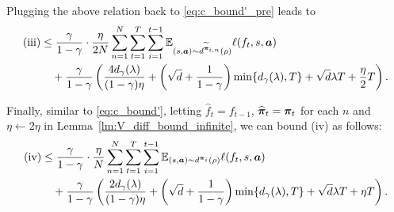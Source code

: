 Plugging the above relation back to \eqref{eq:c_bound'_pre} leads to
\begin{align}\label{eq:c_bound'} 
    \text{(iii)}
    &\leq \frac{\gamma}{1-\gamma}\cdot\frac{\eta}{2N}\sum_{n=1}^N\sum_{t=1}^{T} \sum_{i=1}^{t-1} \mathbb{E}_{(s,{\bm{a}})\sim d^{\widetilde{{\bm{\pi}}}_{i,n}}(\rho)}\ell(f_t,s,{\bm{a}}) \notag\\
    &\quad+\frac{\gamma}{1-\gamma}\left(\frac{4d_\gamma(\lambda)}{(1-\gamma)\eta}
    + \left(\sqrt{d}+\frac{1}{1-\gamma}\right) \min\{d_\gamma(\lambda),T\} +\sqrt{d} \lambda T +\frac{\eta}{2}T\right).
\end{align}


Finally, similar to \eqref{eq:c_bound'}, letting $\widehat{f}_t=f_{t-1}$, $\widehat{{\bm{\pi}}}_t={\bm{\pi}}_t$ for each $n$ and $\eta\leftarrow2\eta$ in Lemma~\ref{lm:V_diff_bound_infinite}, we can bound (iv) as follows:
\begin{align}\label{eq:d_bound'} 
    \text{(iv)} &\leq \frac{\gamma}{1-\gamma}\cdot\frac{\eta}{N}\sum_{n=1}^N\sum_{t=1}^{T} \sum_{i=1}^{t-1} \mathbb{E}_{(s,{\bm{a}})\sim d^{{\bm{\pi}}_i}(\rho)}\ell(f_t,s,{\bm{a}}) \notag\\
    &\quad+\frac{\gamma}{1-\gamma}\left(\frac{2d_\gamma(\lambda)}{(1-\gamma)\eta}
    + \left(\sqrt{d}+\frac{1}{1-\gamma}\right) \min\{d_\gamma(\lambda),T\} +\sqrt{d} \lambda T +\eta T\right).
\end{align}

